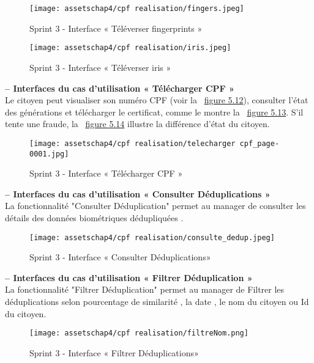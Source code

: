 \begin{figure}[H]
\centering
\texttt{[image: assetschap4/cpf realisation/fingers.jpeg]}
\caption{ Sprint 3 - Interface « Téléverser fingerprints » }
\label{fig:5.10}
\end{figure}



\begin{figure}[H]
\centering
\texttt{[image: assetschap4/cpf realisation/iris.jpeg]}
\caption{ Sprint 3 - Interface « Téléverser iris » }
\label{fig:5.11}
\end{figure}





\textbf{– Interfaces du cas d'utilisation « Télécharger CPF »}\\
Le citoyen peut visualiser son numéro CPF (voir la ~\hyperref[fig:5.12]{figure 5.12}), consulter l'état des générations et télécharger le certificat, comme le montre la ~\hyperref[fig:5.13]{figure 5.13}.
S'il tente une fraude, la ~\hyperref[fig:5.14]{figure 5.14} illustre la différence d'état du citoyen.
\begin{figure}[H]
\centering
\texttt{[image: assetschap4/cpf realisation/telecharger cpf\_page-0001.jpg]}
\caption{ Sprint 3 - Interface « Télécharger CPF » }
\label{fig:5.12}
\end{figure}





\textbf{– Interfaces du cas d'utilisation « Consulter Déduplications »}\\
La fonctionnalité "Consulter Déduplication" permet au manager de consulter les détails des données biométriques dédupliquées .
\begin{figure}[H]
\centering
\texttt{[image: assetschap4/cpf realisation/consulte\_dedup.jpeg]}
\caption{ Sprint 3 - Interface « Consulter Déduplications» }
\label{fig:5.12}
\end{figure}


\textbf{– Interfaces du cas d'utilisation « Filtrer Déduplication »}\\
La fonctionnalité "Filtrer Déduplication" permet au manager de Filtrer les déduplications selon pourcentage de similarité , la date , le nom du citoyen ou Id du citoyen.
\begin{figure}[H]
\centering
\texttt{[image: assetschap4/cpf realisation/filtreNom.png]}
\caption{ Sprint 3 - Interface « Filtrer Déduplications» }
\label{fig:5.12}
\end{figure}

